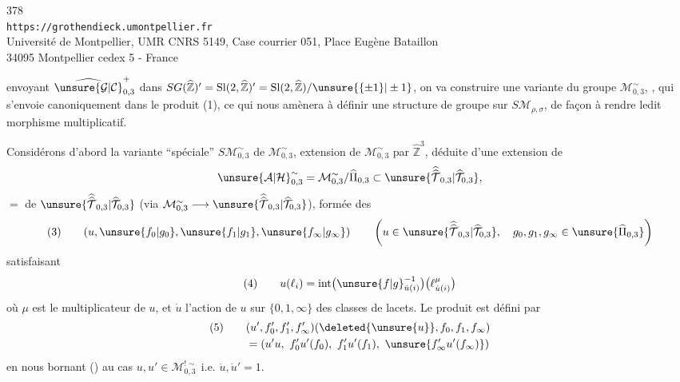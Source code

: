 \begin{center}
378\\
\texttt{https://grothendieck.umontpellier.fr}\\
Université de Montpellier, UMR CNRS 5149, Case courrier 051, Place Eugène Bataillon\\
34095 Montpellier cedex 5 - France
\end{center}


envoyant $\widehat{\unsure{\mathcal{G}|\mathcal{C}}}_{0,3}^{+}$ dans
$SG(\widehat{\mathbb{Z}})'=\mathrm{Sl}(2,\widehat{\mathbb{Z}})'
=\mathrm{Sl}(2,\widehat{\mathbb{Z}})/\unsure{\{\pm1\}|\pm1}$,
on va construire une variante du groupe $\mathcal{M}_{0,3}^{\sim}$,
, qui s'envoie canoniquement dans le produit (1),
ce qui nous amènera à définir une structure de groupe sur
$S\mathcal{M}_{\rho,\sigma}$, de façon à rendre ledit morphisme
multiplicatif.

Considérons d'abord la variante ``spéciale''
$S\mathcal{M}_{0,3}^{\sim}$ de $\mathcal{M}_{0,3}^{\sim}$, extension
de $\mathcal{M}_{0,3}^{\sim}$ par $\widehat{\mathbb{Z}}^3$,
déduite d'une extension de
\[
\unsure{\mathcal{A}|\mathcal{H}}_{0,3}^{\sim}
=\mathcal{M}_{0,3}^{\sim}/\widehat{\Pi}_{0,3}
\subset\unsure{\widehat{\widehat{\mathcal{T}}}_{0,3}|\widehat{\mathcal{T}}_{0,3}},
\]
 $=$  de
$\unsure{\widehat{\widehat{\mathcal{T}}}_{0,3}|\widehat{\mathcal{T}}_{0,3}}$
(via $\mathcal{M}_{0,3}^{\sim}\longrightarrow
\unsure{\widehat{\widehat{\mathcal{T}}}_{0,3}|\widehat{\mathcal{T}}_{0,3}}$),
formée des
\[
(3)\qquad
(u,\unsure{f_0|g_0},\unsure{f_1|g_1},\unsure{f_\infty|g_\infty})
\qquad
\left(u\in\unsure{\widehat{\widehat{\mathcal{T}}}_{0,3}|\widehat{\mathcal{T}}_{0,3}},\quad
g_0,g_1,g_\infty\in\unsure{\widehat{\Pi}_{0,3}}\right)
\]
satisfaisant
\[
(4)\qquad
u(\ell_i)=\operatorname{int}\bigl(\unsure{f|g}_{\dot{u}(i)}^{-1}\bigr)
\bigl(\ell_{\dot{u}(i)}^{\mu}\bigr)
\]
où $\mu$ est le multiplicateur de $u$, et $\dot{u}$ l'action de $u$
sur  $\{0,1,\infty\}$ des classes de lacets.
Le produit est défini par
\[
\begin{aligned}
(5)\qquad &(u',f'_0,f'_1,f'_\infty)
(\deleted{\unsure{u}},f_0,f_1,f_\infty)\\
&=(u'u,\ f'_0u'(f_0),\ f'_1u'(f_1),\ \unsure{f'_\infty u'(f_\infty)})
\end{aligned}
\]
en nous bornant () au cas
$u,u'\in\mathcal{M}_{0,3}^{!\sim}$ i.e. $\dot{u},\dot{u}'=1$.

